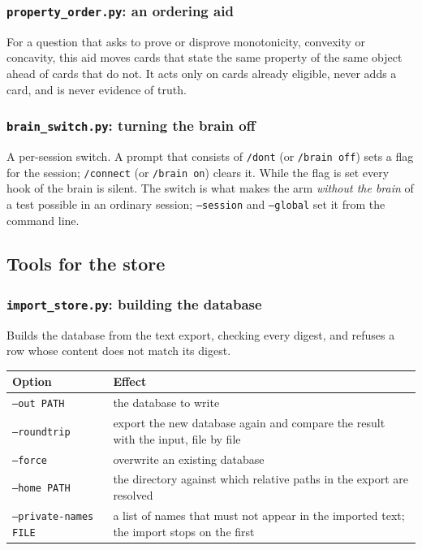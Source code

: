 \subsubsection*{\texttt{property\_order.py}: an ordering aid}
For a question that asks to prove or disprove monotonicity, convexity or concavity, this aid moves cards that state the same property of the same object ahead of cards that do not. It acts only on cards already eligible, never adds a card, and is never evidence of truth.

\subsubsection*{\texttt{brain\_switch.py}: turning the brain off}
A per-session switch. A prompt that consists of \texttt{/dont} (or \texttt{/brain off}) sets a flag for the session; \texttt{/connect} (or \texttt{/brain on}) clears it. While the flag is set every hook of the brain is silent. The switch is what makes the arm \emph{without the brain} of a test possible in an ordinary session; \texttt{--session} and \texttt{--global} set it from the command line.

\subsection{Tools for the store}

\subsubsection*{\texttt{import\_store.py}: building the database}
Builds the database from the text export, checking every digest, and refuses a row whose content does not match its digest.
\begin{center}\small
\begin{tabular}{p{3.6cm}p{10.4cm}}
\toprule
Option & Effect\\
\midrule
\texttt{--out PATH} & the database to write\\
\texttt{--roundtrip} & export the new database again and compare the result with the input, file by file\\
\texttt{--force} & overwrite an existing database\\
\texttt{--home PATH} & the directory against which relative paths in the export are resolved\\
\texttt{--private-names FILE} & a list of names that must not appear in the imported text; the import stops on the first\\
\bottomrule
\end{tabular}
\end{center}

